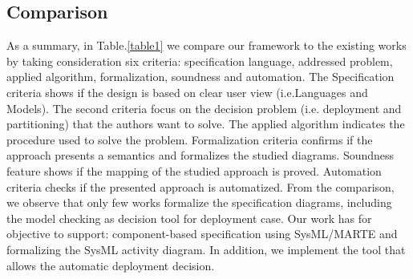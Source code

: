 \documentclass[3p,times,procedia,authoryear,round]{elsarticle}
\begin{document}
\subsection{Comparison}
As a summary, in Table.\ref{table1} we compare our framework to the existing works by taking consideration six criteria:  specification language, addressed problem, applied algorithm, formalization, soundness and automation. The Specification criteria shows if the design is based on clear user view (i.e.Languages and Models). The second criteria focus on the decision problem (i.e. deployment and partitioning) that the authors want to solve. The applied algorithm indicates the procedure used to solve the problem. Formalization criteria confirms if the approach presents a semantics and formalizes the studied diagrams. Soundness feature shows if the mapping of the studied approach is proved. Automation criteria checks if the presented approach is automatized. From the comparison, we observe that only few works formalize the specification diagrams, including the model checking as decision tool for deployment case. Our work has for objective to support: component-based specification using SysML/MARTE and formalizing the SysML activity diagram. In addition, we implement the tool that allows the automatic deployment decision. 	
\end{document}
